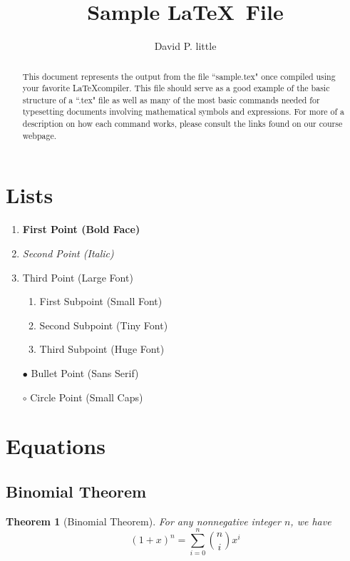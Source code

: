 \documentclass[]{article}
\newtheorem{theorem}{Theorem}
\begin{document}
\title{Sample \LaTeX ~File}
\author{David P. little}
\maketitle

\begin{abstract}
This document represents the output from the file ``sample.tex" once compiled using your favorite \LaTeX compiler.  This file should serve as a good example of the basic structure of a ``.tex" file as well as many of the most basic commands needed for typesetting documents involving mathematical symbols and expressions.  For more of a description on how each command works, please consult the links found on our course webpage.
\end{abstract}

\section{Lists}
\begin{enumerate}
\item {\bf First Point (Bold Face)}
\item {\em Second Point (Italic)}
\item {\Large Third Point (Large Font)}
    \begin{enumerate}
        \item {\small First Subpoint (Small Font)} 
        \item {\tiny Second Subpoint (Tiny Font)} 
        \item {\Huge Third Subpoint (Huge Font)} 
    \end{enumerate}
\item[$\bullet$] {\sf Bullet Point (Sans Serif)}
\item[$\circ$] {\sc Circle Point (Small Caps)} 
\end{enumerate}


\section{Equations}

\subsection{Binomial Theorem}
\begin{theorem}[Binomial Theorem]
For any nonnegative integer $n$, we have
$$(1+x)^n = \sum_{i=0}^n {n \choose i} x^i$$
\end{theorem}
\end{document}
